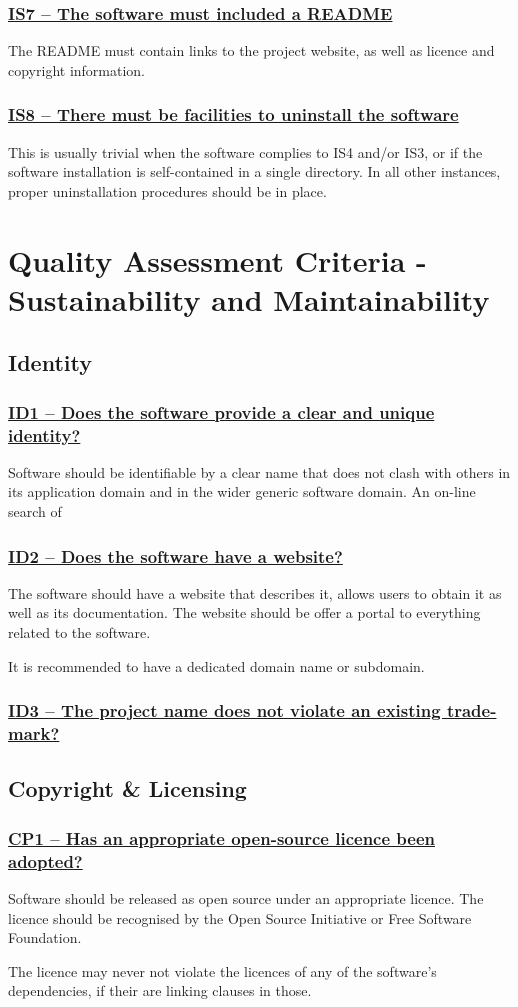 \documentclass[a4paper,11pt]{article}
\newcommand{\criterion}[1]{\subsubsection*{\underline{#1}}}
\begin{document}
\criterion{IS7 -- The software must included a README}

The README must contain links to the project website, as well as licence and copyright
information.

\criterion{IS8 -- There must be facilities to uninstall the software}

This is usually trivial when the software complies to IS4 and/or IS3, or if the
software installation is self-contained in a single directory. In all other
instances, proper uninstallation procedures should be in place.


\section{Quality Assessment Criteria - Sustainability and Maintainability}

\subsection{Identity}

\criterion{ID1 -- Does the software provide a clear and unique identity?}

Software should be identifiable by a clear name that does not clash with others
in its application domain and in the wider generic software domain. An on-line
search of 

\criterion{ID2 -- Does the software have a website?}

The software should have a website that describes it, allows users to obtain
it as well as its documentation. The website should be offer a portal to everything
related to the software.

It is recommended to have a dedicated domain name or subdomain.

\criterion{ID3 -- The project name does not violate an existing trade-mark?}

\subsection{Copyright \& Licensing}

\criterion{CP1 -- Has an appropriate open-source licence been adopted?}

Software should be released as open source under an appropriate licence. The
licence should be recognised by the Open Source Initiative or Free Software
Foundation.

The licence may never not violate the licences of any of the software's
dependencies, if their are linking clauses in those.
\end{document}
